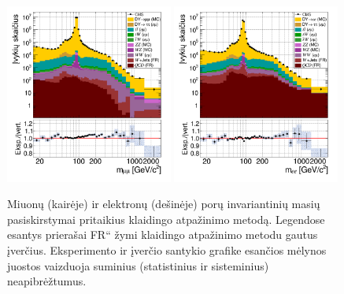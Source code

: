 \documentclass[a4paper, 12pt, oneside]{article}
\newcommand{\ltq}[1]{{\quotedblbase{}#1\textquotedblleft{}}}
\newlength\q
\begin{document}
\begin{figure}[H]
	\includegraphics[width=0.49\textwidth]{Magistrinis/MuMumass_afterFR.png}
	\includegraphics[width=0.49\textwidth]{Magistrinis/EEmass_afterFR.png}
	\vspace{-0.3cm}
	\caption{\label{fig:MassFinal}
		Miuonų (kairėje) ir elektronų (dešinėje) porų invariantinių masių pasiskirstymai pritaikius klaidingo atpažinimo metodą.
		Legendose esantys prierašai \ltq{FR} žymi klaidingo atpažinimo metodu gautus įverčius.
		Eksperimento ir įverčio santykio grafike esančios mėlynos juostos vaizduoja suminius (statistinius ir sisteminius)
		neapibrėžtumus.}
\end{figure}

\newpage
\end{document}
